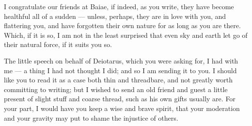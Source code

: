 

 I congratulate our friends at Baiae, if indeed, as you write, they have become healthful all of a sudden --- unless, perhaps, they are in love with you, and flattering you, and have forgotten their own nature for as long as you are there. Which, if it is so, I am not in the least surprised that even sky and earth let go of their natural force, if it suits you so.

 The little speech on behalf of Deiotarus, which you were asking for, I had with me --- a thing I had not thought I did; and so I am sending it to you. I should like you to read it as a case both thin and threadbare, and not greatly worth committing to writing; but I wished to send an old friend and guest a little present of slight stuff and coarse thread, such as his own gifts usually are. For your part, I would have you keep a wise and brave spirit, that your moderation and your gravity may put to shame the injustice of others.
